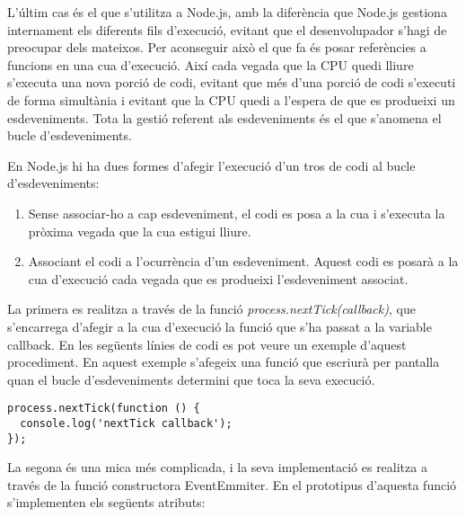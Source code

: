 L'últim cas és el que s'utilitza a Node.js, amb la diferència que Node.js gestiona internament els diferents fils d'execució, evitant que el desenvolupador s'hagi de preocupar dels mateixos. Per aconseguir això el que fa és posar referències a funcions en una cua d'execució. Així cada vegada que la CPU quedi lliure s'executa una nova porció de codi, evitant que més d'una porció de codi s'executi de forma simultània i evitant que la CPU quedi a l'espera de que es produeixi un esdeveniments. Tota la gestió referent als esdeveniments és el que s'anomena el bucle d'esdeveniments. 

En Node.js hi ha dues formes d'afegir l'execució d'un tros de codi al bucle d'esdeveniments: 

\begin{enumerate}
    \item{Sense associar-ho a cap esdeveniment, el codi es posa a la cua i s'executa la pròxima vegada que la cua estigui lliure.}
    \item{Associant el codi a l'ocurrència d'un esdeveniment. Aquest codi es posarà a la cua d'execució cada vegada que es produeixi l'esdeveniment associat.}
\end{enumerate}

La primera es realitza a través de la funció \emph{process.nextTick(callback)}, que s'encarrega d'afegir a la cua d'execució la funció que s'ha passat a la variable callback. En les següents línies de codi es pot veure un exemple d'aquest procediment. En aquest exemple s'afegeix una funció que escriurà per pantalla quan el bucle d'esdeveniments determini que toca la seva execució.

\begin{lstlisting}
process.nextTick(function () {
  console.log('nextTick callback');
});
\end{lstlisting}

La segona és una mica més complicada, i la seva implementació es realitza a través de la funció constructora EventEmmiter. En el prototipus d'aquesta funció s'implementen els següents atributs: 

